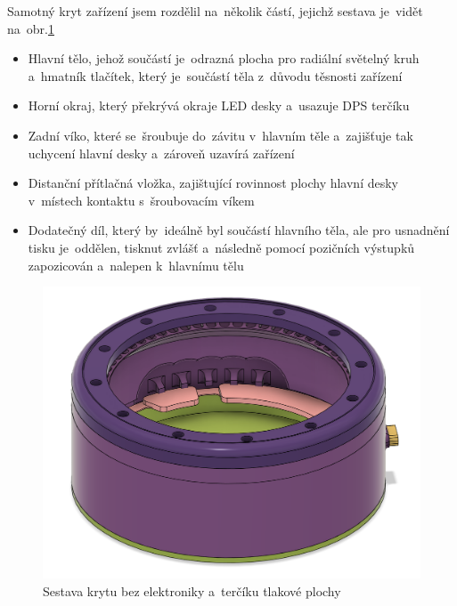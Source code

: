 Samotný kryt zařízení jsem rozdělil na~několik částí, jejichž sestava je~vidět na~obr.\ref{fig:AHS-kryt}
\begin{itemize}
    \item Hlavní tělo, jehož součástí je~odrazná plocha pro radiální světelný kruh a~hmatník tlačítek, který je~součástí těla z~důvodu těsnosti zařízení
    \item Horní okraj, který překrývá okraje LED desky a~usazuje DPS terčíku
    \item Zadní víko, které se~šroubuje do~závitu v~hlavním těle a~zajišťuje tak uchycení hlavní desky a~zároveň uzavírá zařízení
    \item Distanční přítlačná vložka, zajištující rovinnost plochy hlavní desky v~místech kontaktu s~šroubovacím víkem
    \item Dodatečný díl, který by~ideálně byl součástí hlavního těla, ale pro usnadnění tisku je~oddělen, tisknut zvlášť a~následně pomocí pozičních výstupků zapozicován a~nalepen k~hlavnímu tělu  ~
\end{itemize}

\begin{figure}[h!]
    \centering
    \includegraphics[width=\textwidth]{text/PraktickaCast/img/Kryt-Lucerny.png}
    \caption{Sestava krytu bez elektroniky a~terčíku tlakové plochy}
    \label{fig:AHS-kryt}
\end{figure}
